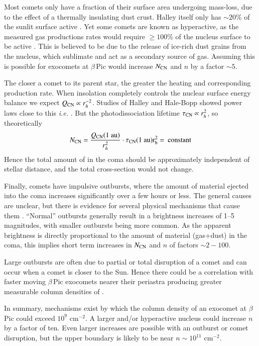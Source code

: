 \documentclass{aa}
\newcommand{\bp}{$\beta$\,Pic}
\begin{document}
Most comets only have a fraction of their surface area undergoing mass-loss, due to the effect of a thermally insulating dust crust.
%
Halley itself only has $\sim20$\% of the sunlit surface active \citep{Keller1987}.
%
Yet some comets are known as hyperactive, as the measured gas productions rates would require $\geq 100$\% of the nucleus surface to be active \citep{Sunshine2021}.
%
This is believed to be due to the release of ice-rich dust grains from the nucleus, which sublimate and act as a secondary source of gas.
%
Assuming this is possible for exocomets at \bp{} would increase $N_{\ce{CN}}$ and $n$ by a factor $\sim 5$.

The closer a comet to its parent star, the greater the heating and corresponding production rate.
%
When insolation completely controls the nuclear surface energy balance we expect
$Q_{\ce{CN}}\propto r_h^{-2}$.
%
Studies of Halley and Hale-Bopp showed power laws close to this {\it i.e.} \cite{Biver2002}.
%
But the photodissociation lifetime $\tau_{\ce{CN}}\propto r_h^{2}$, so theoretically
$$N_{\ce{CN}}=\frac{Q_{\ce{CN}}(1~\rm{au})}{r_h^2}\cdot  \tau_{\ce{CN}} (1~\rm{au}) r_h^2 =\:{\rm constant} $$
Hence the total amount of  in the coma should be approximately independent of stellar distance, and the total cross-section would not change.

Finally, comets have impulsive outbursts, where the amount of material ejected into the coma increases significantly over a few hours or less.
%
The general causes are unclear, but there is evidence for several physical mechanisms that cause them 
\citep{Kelley2021,Muller2024}.
``Normal'' outbursts generally result in a brightness increases of 1--5 magnitudes, with smaller outbursts being more common.
%
As the apparent brightness is directly proportional to the amount of material (gas+dust) in the coma, this implies short term increases in $N_{\ce{CN}}$ and $n$ of factors $\sim 2-100$.

Large outbursts are often due to partial or total disruption of a comet and can occur when a comet is closer to the Sun.
%
Hence there could be a correlation with faster moving \bp{} exocomets nearer their periastra producing greater measurable column densities of .

In summary, mechanisms exist by which the  column density of an exocomet at \bp{} could exceed $10^{9}$ cm$^{-2}$.
%
A larger and/or hyperactive nucleus could increase $n$ by a factor of ten.
%
Even larger increases are possible with an outburst or comet disruption, but the upper boundary is likely to be near $n\sim10^{11}$ cm$^{-2}$.
\end{document}
